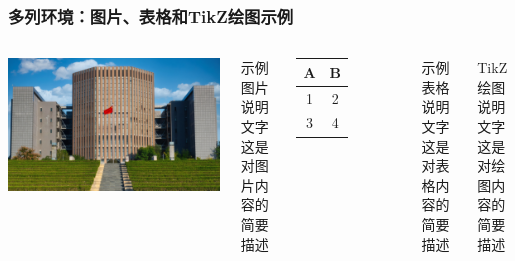 \documentclass[10pt]{beamer}
\begin{document}
\begin{frame}
\frametitle{多列环境：图片、表格和TikZ绘图示例}
\begin{columns}[T]
\centering
\includegraphics[width=0.7\linewidth]{src/example_ahu.jpg}

\vspace{1em}

\parbox[t]{\linewidth}{
\raggedright
示例图片说明文字\\
这是对图片内容的简要描述
}

\centering
\begin{tabular}{|c|c|}
\hline
A & B \\
\hline
1 & 2 \\
3 & 4 \\
\hline
\end{tabular}

\vspace{1em}

\parbox[t]{\linewidth}{
\raggedright
示例表格说明文字\\
这是对表格内容的简要描述
}

\centering
{}

\vspace{1em}

\parbox[t]{\linewidth}{
\raggedright
TikZ绘图说明文字\\
这是对绘图内容的简要描述
}
\end{columns}
\end{frame}
\end{document}

